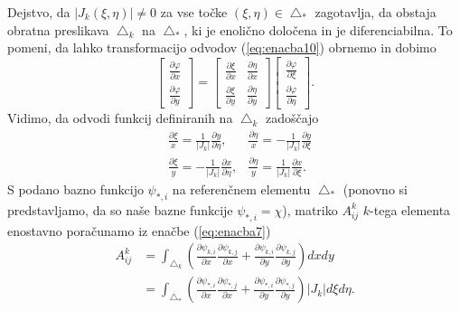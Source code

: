 \documentclass[12pt,a4paper]{article}
\begin{document}
Dejstvo, da $|J_k(\xi, \eta)| \neq 0$ za vse točke $(\xi, \eta) \in \bigtriangleup _*$ zagotavlja, da obstaja obratna preslikava $\bigtriangleup _k$ na $\bigtriangleup _*$, ki je enolično določena in je diferenciabilna. To pomeni, da lahko transformacijo odvodov (\ref{eq:enacba10}) obrnemo in dobimo
\begin{equation} \label{eq:enacba13}
\begin{bmatrix}
\frac{ \partial \varphi}{\partial x}\\ 
\frac{\partial \varphi}{\partial y }
\end{bmatrix} = 
\begin{bmatrix}
 \frac{\partial \xi}{ \partial x}& \frac{\partial \eta}{ \partial x}\\ 
 \frac{\partial \xi}{ \partial y}& \frac{\partial \eta}{ \partial y} 
\end{bmatrix}
\begin{bmatrix}
 \frac{ \partial \varphi}{\partial \xi}\\ 
\frac{\partial \varphi}{\partial \eta }
\end{bmatrix}.
\end{equation}
Vidimo, da odvodi funkcij definiranih na $\bigtriangleup _k$ zadoščajo
\begin{align} \label{eq:enacba14}
&\frac{\partial \xi}{x}= \frac{1}{|J_k|}\frac{\partial y}{\partial \eta}, &\frac{\partial \eta}{x}= -\frac{1}{|J_k|}\frac{\partial y}{\partial \xi} \nonumber \\
&\frac{\partial \xi}{y}= -\frac{1}{|J_k|}\frac{\partial x}{\partial \eta}, &\frac{\partial \eta}{y}= \frac{1}{|J_k|}\frac{\partial x}{\partial \xi}.
\end{align}
S podano bazno funkcijo $\psi_{*,i}$ na referenčnem elementu $\bigtriangleup _*$ (ponovno si predstavljamo, da so naše bazne funkcije $\psi_{*,i}=\chi$), matriko $A_{ij} ^{k}$  $k$-tega elementa enostavno poračunamo iz enačbe (\ref{eq:enacba7})
\begin{align} \label{eq:enacba15}
A_{ij} ^{k}&= \int _{\bigtriangleup _k} \left( \frac{\partial \psi _{k,i}}{\partial x} \frac{ \partial \psi_{k,j}}{\partial x} + \frac{\partial \psi _{k,i}}{\partial y} \frac{ \partial \psi_{k,j}}{\partial y} \right) dx dy \nonumber \\
&= \int _{\bigtriangleup _*}
\left(  
\frac{\partial \psi _{*,i}}{\partial x} \frac{ \partial \psi_{*,j}}{\partial x} + \frac{\partial \psi _{*,i}}{\partial y} \frac{ \partial \psi_{*,j}}{\partial y}
\right)
|J_k| d\xi d \eta.
\end{align}
\end{document}
